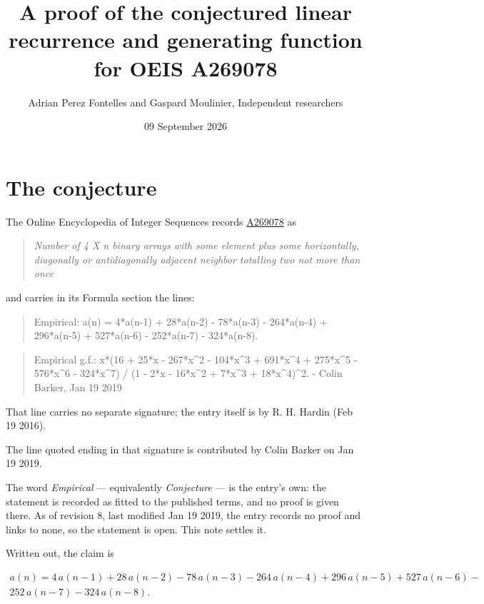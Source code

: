 \documentclass[11pt]{article}
\title{A proof of the conjectured linear recurrence and generating function for OEIS A269078}
\author{Adrian Perez Fontelles and Gaspard Moulinier, Independent researchers}
\date{09 September 2026}
\theoremstyle{definition}
\begin{document}
\maketitle
\section{The conjecture}

The Online Encyclopedia of Integer Sequences records \href{https://oeis.org/A269078}{A269078} as

\begin{quote}\itshape Number of 4 X n binary arrays with some element plus some horizontally, diagonally or antidiagonally adjacent neighbor totalling two not more than once\end{quote}

and carries in its Formula section the lines:

\begin{quote}\ttfamily Empirical: a(n) = 4*a(n-1) + 28*a(n-2) - 78*a(n-3) - 264*a(n-4) + 296*a(n-5) + 527*a(n-6) - 252*a(n-7) - 324*a(n-8).\end{quote}

\begin{quote}\ttfamily Empirical g.f.: x*(16 + 25*x - 267*x\textasciicircum{}2 - 104*x\textasciicircum{}3 + 691*x\textasciicircum{}4 + 275*x\textasciicircum{}5 - 576*x\textasciicircum{}6 - 324*x\textasciicircum{}7) / (1 - 2*x - 16*x\textasciicircum{}2 + 7*x\textasciicircum{}3 + 18*x\textasciicircum{}4)\textasciicircum{}2. - Colin Barker, Jan 19 2019\end{quote}

That line carries no separate signature; the entry itself is by R. H. Hardin (Feb 19 2016).

The line quoted ending in that signature is contributed by Colin Barker on Jan 19 2019.

The word {\itshape Empirical} --- equivalently {\itshape Conjecture} --- is the entry's own: the statement is recorded as fitted to the published terms, and no proof is given there. As of revision 8, last modified Jan 19 2019, the entry records no proof and links to none, so the statement is open. This note settles it.

Written out, the claim is

\begin{multline*} a(n) = 4\,a(n-1) + 28\,a(n-2) - 78\,a(n-3) - 264\,a(n-4) + 296\,a(n-5) + 527\,a(n-6) - \\ 252\,a(n-7) - 324\,a(n-8). \end{multline*}
\end{document}
